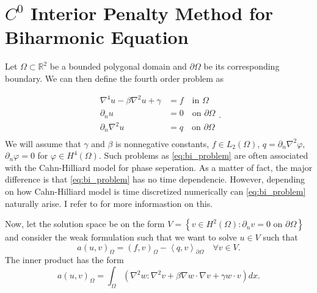 \newpage
\section{ $C^0$ Interior Penalty Method for Biharmonic Equation}
\label{sec:ch1}



Let $\Omega \subset   \mathbb{R} ^2$ be a bounded polygonal domain and $\partial \Omega $ be its corresponding boundary.
We can then define the fourth order problem as

\begin{equation}
\label{eq:bi_problem}
\begin{split}
    \nabla ^4 u - \beta \nabla ^2 u  + \gamma  & = f \quad \text{in } \Omega   \\
    \partial _{n} u & = 0 \quad \text{on } \partial \Omega  \\
    \partial _{n} \nabla ^2 u & = q \quad \text{on } \partial \Omega   \\
\end{split}
.\end{equation}
We will assume that $\gamma $ and $\beta $ is nonnegative constants, $f \in L_{2}\left( \Omega  \right) $, $q =
\partial _{n} \nabla ^2 \varphi $, $ \partial _{n}\varphi  = 0 $ for $ \varphi  \in H^{4}\left(  \Omega
\right)$. Such problems as \eqref{eq:bi_problem} are often associated with the Cahn-Hilliard model
\cite{cahnhilliard1957} for phase seperation. As a matter of fact, the major difference is that \eqref{eq:bi_problem}
has no time dependencie. However, depending on how Cahn-Hilliard model is time discretized numerically can
\eqref{eq:bi_problem} naturally arise. I refer to \cite{brenner2012quadratic} for more informastion on this.

Now, let the solution space be on the form  $V = \left\{ v \in H^2\left( \Omega  \right) : \partial _{n} v = 0  \text{ on }
\partial \Omega  \right\} $ and consider the weak formulation such that we want to solve $u \in  V$ such that
\begin{equation}
\label{eq:bi_harmonic_weak}
a\left( u,v \right)_{\Omega } = \left( f,v \right)_{\Omega } - \left<q,v \right>_{\partial \Omega } \quad \forall v \in
V
.\end{equation}
The inner product has the form \[
a\left( u,v \right)_{\Omega } = \int_{\Omega }^{} \left( \nabla ^2 w : \nabla ^2 v + \beta \nabla w\cdot \nabla v +
\gamma w\cdot v \right) dx  .
\]

